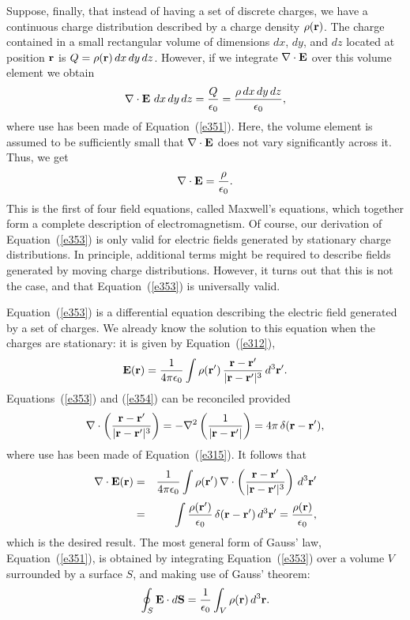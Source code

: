 Suppose, finally, that instead of having a set of discrete charges, we have a
continuous charge distribution described by a charge density $\rho({\bf r})$.
The charge contained in a small rectangular volume of dimensions $dx$, $dy$, and $dz$
located at position
 ${\bf r}$ is $Q=\rho({\bf r})\,dx\,dy\,dz$. However, if we integrate
$\nabla\cdot {\bf E}$ over this volume element we obtain
\begin{equation}
\nabla \cdot {\bf E} \,\,dx\,dy\,dz = \frac{Q}{\epsilon_0}= 
\frac{\rho\,dx\,dy\,dz}{\epsilon_0},
\end{equation}
where use has been made of Equation~(\ref{e351}). Here, the volume element is assumed to be
sufficiently small that $\nabla\cdot{\bf E}$ does not vary significantly across
it. Thus, we get
\begin{equation}\label{e353}
\nabla \cdot {\bf E} = \frac{\rho}{\epsilon_0}.
\end{equation}
This is the first of four field equations, called Maxwell's equations, which 
 together form 
a complete description of electromagnetism. Of course, our derivation of
Equation~(\ref{e353}) is only valid for electric fields generated by stationary
charge distributions. In principle, additional terms might be required to describe
fields generated by moving charge distributions. However, 
it turns out that this is not the case,
and that Equation~(\ref{e353}) is universally valid. 

Equation~(\ref{e353}) is a differential equation describing the electric field generated
by a set of  charges. We already know the solution to this equation when the
charges are stationary:
it is given by Equation~(\ref{e312}),
\begin{equation}\label{e354}
{\bf E}({\bf r}) = \frac{1}{4\pi \epsilon_0} \int \rho({\bf r}')\,
\frac{{\bf r} - {\bf r}'}{|{\bf r} - {\bf r}'|^3}\,d^3{\bf r}'.
\end{equation}
Equations~(\ref{e353}) and (\ref{e354}) can be reconciled provided 
\begin{equation}\label{e355}
\nabla\cdot\left(\frac{{\bf r} - {\bf r}'}{|{\bf r} - {\bf r}'|^3}\right)
=- \nabla^2\left(\frac{1}{|{\bf r} - {\bf r}'|}\right)= 4\pi\,\delta({\bf r}
-{\bf r}'),
\end{equation}
where use has been made of Equation~(\ref{e315}).
It follows that
\begin{eqnarray}
\nabla\cdot{\bf E}({\bf r})& = &\frac{1}{4\pi\epsilon_0}\int
\rho({\bf r}')\,\nabla\cdot\left(\frac{{\bf r} - {\bf r}'}
{|{\bf r} - {\bf r}'|^3}\right)\,d^3{\bf r}'\nonumber\\[0.5ex]
&=&
\int \frac{\rho({\bf r}')}{\epsilon_0} \,\delta({\bf r} - {\bf r}')\,
d^3{\bf r}' = \frac{\rho({\bf r})}{\epsilon_0},
\end{eqnarray}
which is the desired result. The most general form  of Gauss' law, Equation~(\ref{e351}),
is obtained by integrating Equation~(\ref{e353}) over a volume $V$ surrounded by 
a surface $S$, and making use of
Gauss' theorem:
\begin{equation}
\oint_S {\bf E}\cdot d{\bf S} = \frac{1}{\epsilon_0} \int_V \rho({\bf r})\,d^3{\bf r}.
\end{equation}

